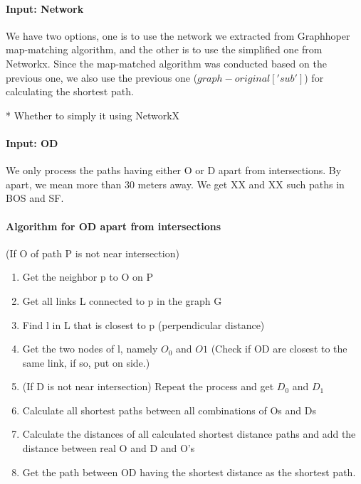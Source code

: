 \documentclass{article}
\begin{document}
\paragraph{Input: Network}
We have two options, one is to use the network we extracted from Graphhoper map-matching algorithm, and the other is to use the simplified one from Networkx. Since the map-matched algorithm was conducted based on the previous one, we also use the previous one ($graph-original['sub']$) for calculating the shortest path.

* Whether to simply it using NetworkX

\paragraph{Input: OD}
We only process the paths having either O or D apart from intersections. By apart, we mean more than 30 meters away. We get XX and XX such paths in BOS and SF. 

\paragraph{Algorithm for OD apart from intersections}
(If O of path P is not near intersection)
\begin{enumerate}
    \item Get the neighbor p to O on P
    \item Get all links L connected to p in the graph G
    \item Find l in L that is closest to p (perpendicular distance)
    \item Get the two nodes of l, namely $O_0$ and $O1$
    (Check if OD are closest to the same link, if so, put on side.)
    \item (If D is not near intersection) Repeat the process and get $D_0$ and $D_1$
    \item Calculate all shortest paths between all combinations of Os and Ds
    \item Calculate the distances of all calculated shortest distance paths and add the distance between real O and D and O's 
    \item Get the path between OD having the shortest distance as the shortest path.  
\end{enumerate}
\end{document}
